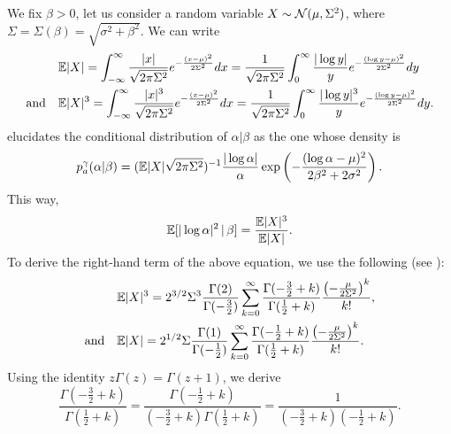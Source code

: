 We fix $\beta>0$, let us consider a random variable $X\sim\mathcal{N}(\mu,\Sigma^2)$, where $\Sigma=\Sigma(\beta) = \sqrt{\sigma^2+\beta^2}$. We can write
    \begin{align}
       &\mathbb{E}|X| = \int_{-\infty}^\infty  \frac{|x|}{\sqrt{2\pi\Sigma^2}}e^{-\frac{(x-\mu)^2}{2\Sigma^2}}dx = \frac{1}{\sqrt{2\pi\Sigma^2}} \int_0^\infty \frac{|\log y|}{y}e^{-\frac{(\log y-\mu)^2}{2\Sigma^2}}dy\label{eq:app2-|x|}\\
       \text{and}\quad &
            \mathbb{E}|X|^3 = \int_{-\infty}^\infty  \frac{|x|^3}{\sqrt{2\pi\Sigma^2}}e^{-\frac{(x-\mu)^2}{2\Sigma^2}}dx = \frac{1}{\sqrt{2\pi\Sigma^2}} \int_0^\infty \frac{|\log y|^3}{y}e^{-\frac{(\log y-\mu)^2}{2\Sigma^2}}dy.
    \end{align}
 elucidates the conditional distribution of $\alpha|\beta$ as the one whose density is
    \begin{equation}
        p^\gamma_a(\alpha|\beta) = (\mathbb{E}|X|\sqrt{2\pi\Sigma^2})^{-1}\frac{|\log\alpha|}{\alpha} \exp\left(-\frac{(\log\alpha-\mu)^2}{2\beta^2+2\sigma^2}  \right).
    \end{equation}
This way,
    \begin{equation}\label{eq:app-Elog2|beta}
        \mathbb{E}[|\log\alpha|^2\,|\,\beta] = \frac{\mathbb{E}|X|^3}{\mathbb{E}|X|}.
    \end{equation}
To derive the right-hand term of the above equation, we use the following (see \cite{winkelbauer_moments_2014}):
    \begin{equation}
        \begin{aligned}
        &\mathbb{E}|X|^3 =  2^{3/2}\Sigma^3 \frac{\Gamma(2)}{\Gamma(-\frac{3}{2})} \sum_{k=0}^\infty \frac{\Gamma(-\frac{3}{2}+k)}{\Gamma(\frac{1}{2}+k)}\frac{\left(-\frac{\mu}{2\Sigma^2}\right)^k}{k!}, \\
        \text{and}\quad& 
            \mathbb{E}|X| =  2^{1/2}\Sigma \frac{\Gamma(1)}{\Gamma(-\frac{1}{2})} \sum_{k=0}^\infty \frac{\Gamma(-\frac{1}{2}+k)}{\Gamma(\frac{1}{2}+k)}\frac{\left(-\frac{\mu}{2\Sigma^2}\right)^k}{k!}.
        \end{aligned}
    \end{equation}
Using the identity $z\Gamma(z)=\Gamma(z+1)$, we derive 
    \begin{equation}
        \frac{\Gamma(-\frac{3}{2}+k)}{\Gamma(\frac{1}{2}+k)} = \frac{\Gamma(-\frac{1}{2}+k)}{(-\frac{3}{2}+k)\Gamma(\frac{1}{2}+k)}= \frac{1}{(-\frac{3}{2}+k)(-\frac{1}{2}+k)}.
    \end{equation}
